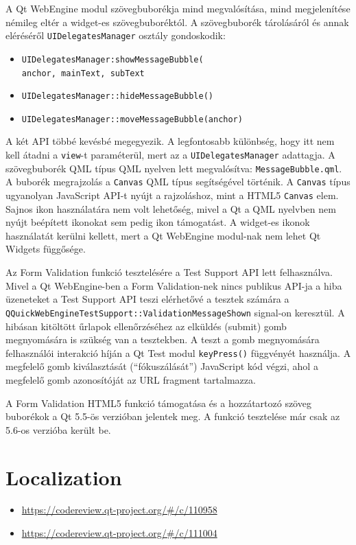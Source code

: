\documentclass[12pt]{report}
\let\origurl\url
\renewcommand{\url}[1]{%
    \textcolor{blue}{\origurl{#1}}
}
\newcommand{\gerrit}[1]{%
    \textcolor{qtgreen}{\origurl{https://codereview.qt-project.org/\#/c/#1}}
}
\begin{document}
A Qt WebEngine modul szövegbuborékja mind megvalósítása, mind megjelenítése némileg eltér
a widget-es szövegbuboréktól. A szövegbuborék tárolásáról és annak eléréséről
\texttt{UIDelegatesManager} osztály gondoskodik:
\begin{itemize}
    \item \texttt{UIDelegatesManager:showMessageBubble(} \\
                    \texttt{anchor, mainText, subText}
    \item \texttt{UIDelegatesManager::hideMessageBubble()}
    \item \texttt{UIDelegatesManager::moveMessageBubble(anchor)}
\end{itemize}
A két API többé kevésbé megegyezik. A legfontosabb különbség, hogy itt nem kell átadni a
\texttt{view}-t paraméterül, mert az a \texttt{UIDelegatesManager} adattagja. A szövegbuborék
QML típus QML nyelven lett megvalósítva: \texttt{MessageBubble.qml}. A buborék
megrajzolás a \texttt{Canvas} QML típus segítségével történik. A \texttt{Canvas} típus
ugyanolyan JavaScript API-t nyújt a rajzoláshoz, mint a HTML5 \texttt{Canvas} elem.
Sajnos ikon használatára nem volt lehetőség, mivel a Qt a QML nyelvben nem nyújt beépített
ikonokat sem pedig ikon támogatást. A widget-es ikonok használatát kerülni kellett, mert
a Qt WebEngine modul-nak nem lehet Qt Widgets függősége.

Az Form Validation funkció tesztelésére a Test Support API lett felhasználva. Mivel a
Qt WebEngine-ben a Form Validation-nek nincs publikus API-ja a hiba üzeneteket a
Test Support API teszi elérhetővé a tesztek számára a
\texttt{QQuickWebEngineTestSupport::ValidationMessageShown}
signal-on keresztül. A hibásan kitöltött űrlapok ellenőrzéséhez az elküldés (submit) gomb
megnyomására is szükség van a tesztekben. A teszt a gomb megnyomására felhasználói interakció
híján a Qt Test modul \texttt{keyPress()} függvényét használja. A megfelelő gomb
kiválasztását (``fókuszálását'') JavaScript kód végzi, ahol a megfelelő gomb azonosítóját
az URL fragment tartalmazza.

A Form Validation HTML5 funkció támogatása és a hozzátartozó szöveg buborékok a Qt 5.5-ös
verzióban jelentek meg. A funkció tesztelése már csak az 5.6-os verzióba került be.

\section{Localization}

\begin{center}
    \begin{reviewbox}
        \begin{itemize}
            \renewcommand{\labelitemi}{\textcolor{qtgreen}{$\blacktriangleright$}}
            \item \gerrit{110958}
            \item \gerrit{111004}
        \end{itemize}
    \end{reviewbox}
\end{center}
\end{document}
